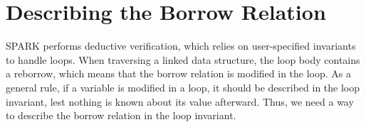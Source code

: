 \documentclass[runningheads]{llncs}
\begin{document}
\section{Describing the Borrow Relation}

%
SPARK performs deductive verification, which relies on user-specified invariants to handle loops. When traversing a linked data structure, the loop body contains a reborrow, which means that the borrow relation is modified in the loop. As a general rule, if a variable is modified in a loop, it should be described in the loop invariant, lest nothing is known about its value afterward. Thus, we need a way to describe the borrow relation in the loop invariant.
\end{document}
